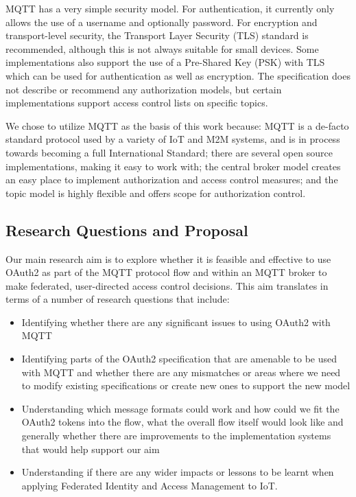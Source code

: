\documentclass{llncs}
\begin{document}
MQTT has a very simple security model. For authentication, it currently only allows the use of a username and optionally password.
For encryption and transport-level security, the Transport Layer Security (TLS) standard is recommended, 
although this is not always suitable for small devices. 
Some implementations also support the use of a Pre-Shared Key (PSK) with TLS which can be used for authentication as well as encryption.
The specification does not describe or recommend 
any authorization models, but certain implementations support access control lists on specific topics.

We chose to utilize MQTT as the basis of this 
work because: MQTT is a de-facto standard protocol used by a variety of IoT and M2M systems, and is in process towards becoming a full International Standard; there are several open source implementations, making it easy to work with; the central broker model creates an easy place to implement authorization and access control measures; and
the topic model is highly flexible and offers scope for authorization control.

\subsection{Research Questions and Proposal}
Our main research aim is to explore whether it is feasible and effective to use 
OAuth2 as part of the MQTT protocol flow and within an MQTT broker to make federated, user-directed access control 
decisions.  This aim translates in terms of a number of research questions that include:
\begin{itemize}
\item Identifying whether there are any significant issues to using OAuth2 with MQTT 
\item Identifying parts of the OAuth2 specification that are amenable to be used with MQTT and whether there are any mismatches or areas where we need to modify existing specifications or create new ones to support the new model
\item Understanding which message formats could work and how could we fit the OAuth2 tokens into the flow, what the overall flow itself would look like and generally whether there are improvements to the implementation systems that would help support our aim
\item Understanding if there are any wider impacts or lessons to be learnt when applying  Federated Identity and Access Management to IoT.
\end{itemize}
\end{document}
